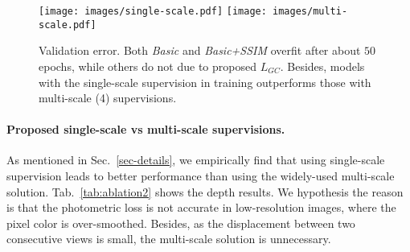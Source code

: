 \documentclass{article}
\newcommand{\tabref}[1]{Tab.~\ref{#1}}
\newcommand{\secref}[1]{Sec.~\ref{#1}}
\begin{document}
\begin{table}[h]
    \caption{Ablation studies on $L_{GC}$ and $M$. Brackets show results of multi-scale (4) supervisions.} 
    \label{tab:ablation1}
    \centering
\end{table}


\begin{figure}[ht]
\centering
\texttt{[image: images/single-scale.pdf]} 
\texttt{[image: images/multi-scale.pdf]}
\caption{Validation error.
Both \emph{Basic} and \emph{Basic+SSIM} overfit after about $50$ epochs, while others do not due to proposed $L_{GC}$.
Besides, models with the single-scale supervision in training outperforms those with multi-scale (4) supervisions.
}
\label{fig-ablation}
\end{figure}



\paragraph{Proposed single-scale vs multi-scale supervisions.}
As mentioned in \secref{sec-details}, we empirically find that using single-scale supervision leads to better performance than using the widely-used multi-scale solution.
\tabref{tab:ablation2} shows the depth results.
We hypothesis the reason is that the photometric loss is not accurate in low-resolution images, where the pixel color is over-smoothed.
Besides, as the displacement between two consecutive views is small, the multi-scale solution is unnecessary.
\end{document}
